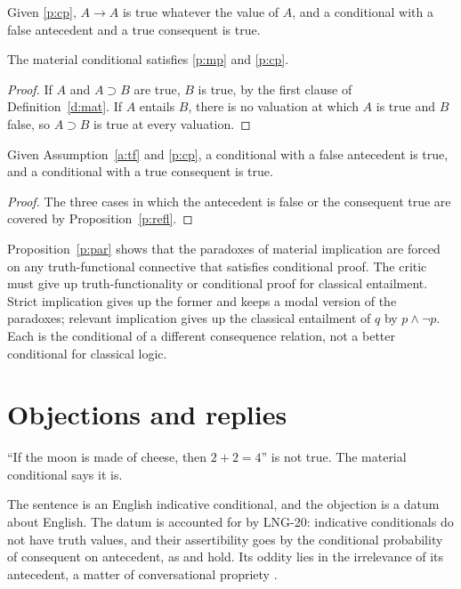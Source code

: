 \documentclass{situationist-preprint}
\begin{document}
\begin{proposition}\label{p:refl}
Given \ref{p:cp}, $A \to A$ is true whatever the value of $A$, and a conditional with a false antecedent and a true consequent is true.
\end{proposition}

\begin{proposition}\label{p:sat}
The material conditional satisfies \ref{p:mp} and \ref{p:cp}.
\end{proposition}

\begin{proof}
If $A$ and $A \supset B$ are true, $B$ is true, by the first clause of Definition~\ref{d:mat}. If $A$ entails $B$, there is no valuation at which $A$ is true and $B$ false, so $A \supset B$ is true at every valuation.
\end{proof}

\begin{proposition}\label{p:par}
Given Assumption~\ref{a:tf} and \ref{p:cp}, a conditional with a false antecedent is true, and a conditional with a true consequent is true.
\end{proposition}

\begin{proof}
The three cases in which the antecedent is false or the consequent true are covered by Proposition~\ref{p:refl}.
\end{proof}

Proposition~\ref{p:par} shows that the paradoxes of material implication are forced on any truth-functional connective that satisfies conditional proof. The critic must give up truth-functionality or conditional proof for classical entailment. Strict implication gives up the former and keeps a modal version of the paradoxes; relevant implication gives up the classical entailment of $q$ by $p \wedge \neg p$. Each is the conditional of a different consequence relation, not a better conditional for classical logic.

\section{Objections and replies}

\begin{objection}
\enquote{If the moon is made of cheese, then $2+2=4$} is not true. The material conditional says it is.
\end{objection}

\begin{reply}
The sentence is an English indicative conditional, and the objection is a datum about English. The datum is accounted for by LNG-20: indicative conditionals do not have truth values, and their assertibility goes by the conditional probability of consequent on antecedent, as \citet{Adams1975} and \citet{Edgington1995} hold. Its oddity lies in the irrelevance of its antecedent, a matter of conversational propriety \citep{Grice1989}.
\end{reply}
\end{document}
